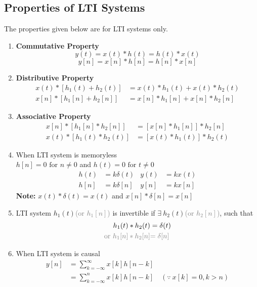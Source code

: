 \documentclass[oneside]{book}
\begin{document}
\subsection{Properties of LTI Systems}
The properties given below are for LTI systems only.
\begin{enumerate}
	\item \textbf{Commutative Property}
	      \[
		      y(t) = x(t) * h(t) = h(t) * x(t)
	      \]
	      \[
		      y[n] = x[n] * h[n] = h[n] * x[n]
	      \]
	\item \textbf{Distributive Property}
	      \begin{align*}
		      x(t)*[h_1(t) + h_2(t)] & = x(t)*h_1(t) + x(t)*h_2(t) \\
		      x[n]*[h_1[n] + h_2[n]] & = x[n]*h_1[n] + x[n]*h_2[n]
	      \end{align*}
	\item \textbf{Associative Property}
	      \begin{align*}
		      x[n]*[h_1[n] *h_2[n]] & = [x[n]*h_1[n]]*h_2[n] \\
		      x(t)*[h_1(t) *h_2(t)] & = [x(t)*h_1(t)]*h_2(t)
	      \end{align*}
	\item When LTI system is memoryless\\
	      \(h[n] = 0 \text{ for } n \neq 0\) and \(h(t) = 0 \text{ for } t \neq 0\)
	      \begin{align*}
		      h(t) & = k\delta(t) & y(t) & = kx(t) \\
		      h[n] & = k\delta[n] & y[n] & = kx[n]
	      \end{align*}
	      \textbf{Note: } \(x(t)*\delta(t) = x(t)\) and \(x[n]*\delta[n] = x[n]\)
	\item LTI system \(h_1(t)\)\textcolor{gray}{(or \(h_1[n]\))} is invertible if \(\exists\ h_2(t)\)\textcolor{gray}{(or \(h_2[n]\))}, such that
	      \begin{align*}
		      h_1(t)*h_2(t)                                & = \delta(t)                   \\
		      \textcolor{gray}{\text{or } h_1[n] * h_2[n]} & \textcolor{gray}{= \delta[n]}
	      \end{align*}
	\item When LTI system is causal
	      \begin{align*}
		      y[n] & = \sum\limits_{k = -\infty}^{\infty} x[k]h[n-k]                          \\
		           & = \sum\limits_{k = -\infty}^n x[k]h[n-k]\quad{(\because\ x[k] = 0, k>n)} \\

\end{align*}
\end{enumerate}
\end{document}
